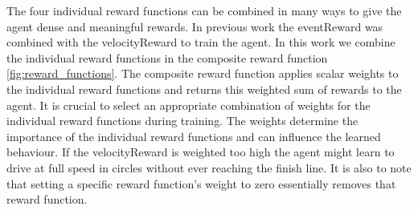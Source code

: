 
The four individual reward functions can be combined in many ways to give the agent dense and meaningful rewards. In previous work the eventReward was combined with the velocityReward to train the agent. In this work we combine the individual reward functions in the composite reward function \ref{fig:reward_functions}. The composite reward function applies scalar weights to the individual reward functions and returns this weighted sum of rewards to the agent. It is crucial to select an appropriate combination of weights for the individual reward functions during training. The weights determine the importance of the individual reward functions and can influence the learned behaviour. If the velocityReward is weighted too high the agent might learn to drive at full speed in circles without ever reaching the finish line. It is also to note that setting a specific reward function's weight to zero essentially removes that reward function.

